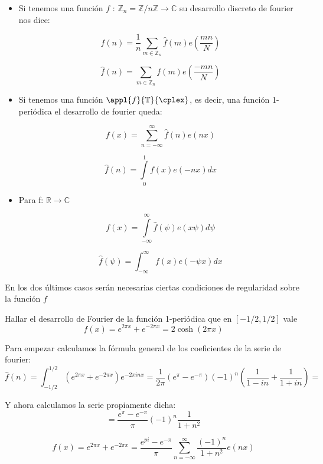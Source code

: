 \begin{itemize}

\item Si tenemos una función $f$ : $\mathbb{Z}_{n} = \mathbb{Z} / n \mathbb{Z} \rightarrow \mathbb{C}$ su desarrollo discreto de fourier nos dice:

$$ f(n) = \frac{1}{n} \sum_{m \in \mathbb{Z}_{n}} \hat{f}(m) e \left( \frac{mn}{N} \right) $$

$$ \hat{f}(n) = \sum_{m \in \mathbb{Z}_{n}} f(m) e \left( \frac{-mn}{N} \right)$$

\item Si tenemos una función $\appl{f}{\mathbb{T}}{\cplex}$, es decir, una función 1-periódica el desarrollo de fourier queda:

$$ f(x) = \sum^{\infty}_{n = -\infty} \hat{f} (n) e (nx) $$

$$ \hat{f} (n) = \int\limits_{0}^{1} f(x) e (-nx) dx $$

\item Para f: $\mathbb{R} \rightarrow \mathbb{C}$

$$ f(x) = \int\limits^{\infty}_{-\infty} \hat{f}(\psi) e(x \psi) d\psi $$

$$ \hat{f}(\psi) = \int^{\infty}_{-\infty} f(x) e(-\psi x)dx$$

\end{itemize}

\obs En los dos últimos casos serán necesarias ciertas condiciones de regularidad sobre la función $f$

\begin{example}

	Hallar el desarrollo de Fourier de la función 1-periódica que en $[-1/2, 1/2]$ vale
	\[f(x)=e^{2\pi x} + e^{-2\pi x } = 2 \cosh (2 \pi x)\]

	Para empezar calculamos la fórmula general de los coeficientes de la serie de fourier:
	$$\hat{f}(n) = \int ^{1/2}_{-1/2} \left( e^{2 \pi x} + e ^{-2 \pi x} \right) e ^{-2 \pi i n x} = \frac{1}{2 \pi} (e^{\pi} - e^{-\pi}) (-1)^{n} \left( \frac{1}{1-in} + \frac{1}{1 + in} \right) =$$

	Y ahora calculamos la serie propiamente dicha:
	$$ = \frac{e^{\pi} - e^{-\pi}}{\pi} (-1)^{n} \frac{1}{1 + n^2}$$

	$$ f(x) = e ^{2 \pi x} + e^{-2 \pi x} = \frac{e^{pi} - e^{-\pi}}{\pi} \sum_{n = -\infty}^{\infty} \frac{(-1)^n}{1 + n^2} e(nx) $$

\end{example}


